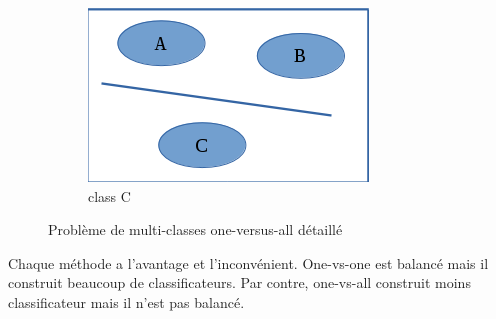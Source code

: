 \begin{figure}[H]
\begin{subfigure}[b]{0.30\textwidth}
                \includegraphics[width=\textwidth]{images/classc}
                \caption{class C}
                \label{classc}
        \end{subfigure}
        \caption{Problème de multi-classes one-versus-all détaillé}\label{1vsalldetail}
\end{figure}


Chaque méthode a l'avantage et l'inconvénient. One-vs-one est balancé mais il construit beaucoup de classificateurs. Par contre, one-vs-all construit moins classificateur mais il n'est pas balancé.